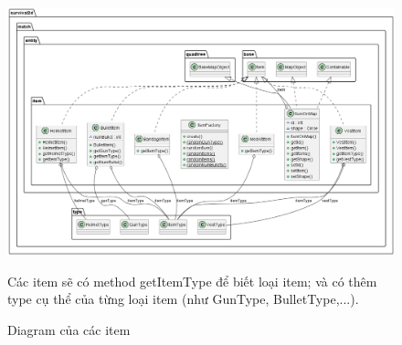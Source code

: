 \documentclass[12pt,a4paper]{article}
\begin{document}
  \begin{figure}
    \centering
    \includegraphics[width=\textwidth]{Img/uml/item.png}
    \caption{Diagram của các item}
    Các item sẽ có method getItemType để biết loại item; và có thêm type cụ thể của từng loại item (như GunType, BulletType,...).
  \end{figure}
\end{document}
